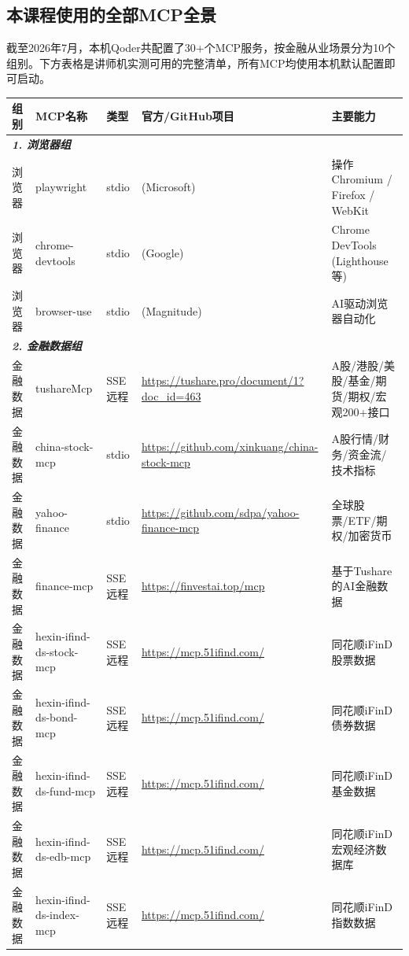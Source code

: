 \subsection{本课程使用的全部MCP全景}

截至2026年7月，本机Qoder共配置了30+个MCP服务，按金融从业场景分为10个组别。下方表格是讲师机实测可用的完整清单，所有MCP均使用本机默认配置即可启动。

\begin{table}[H]
\centering
\small
\begin{tabular}{llllp{4cm}}
\toprule
\textbf{组别} & \textbf{MCP名称} & \textbf{类型} & \textbf{官方/GitHub项目} & \textbf{主要能力} \\
\midrule
\multicolumn{5}{l}{\textit{\textbf{1. 浏览器组}}} \\
\midrule
浏览器 & playwright & stdio & (Microsoft) & 操作Chromium / Firefox / WebKit \\
浏览器 & chrome-devtools & stdio & (Google) & Chrome DevTools (Lighthouse等) \\
浏览器 & browser-use & stdio & (Magnitude) & AI驱动浏览器自动化 \\
\midrule
\multicolumn{5}{l}{\textit{\textbf{2. 金融数据组}}} \\
\midrule
金融数据 & tushareMcp & SSE远程 & \url{https://tushare.pro/document/1?doc_id=463} & A股/港股/美股/基金/期货/期权/宏观200+接口 \\
金融数据 & china-stock-mcp & stdio & \url{https://github.com/xinkuang/china-stock-mcp} & A股行情/财务/资金流/技术指标 \\
金融数据 & yahoo-finance & stdio & \url{https://github.com/sdpa/yahoo-finance-mcp} & 全球股票/ETF/期权/加密货币 \\
金融数据 & finance-mcp & SSE远程 & \url{https://finvestai.top/mcp} & 基于Tushare的AI金融数据 \\
金融数据 & hexin-ifind-ds-stock-mcp & SSE远程 & \url{https://mcp.51ifind.com/} & 同花顺iFinD股票数据 \\
金融数据 & hexin-ifind-ds-bond-mcp & SSE远程 & \url{https://mcp.51ifind.com/} & 同花顺iFinD债券数据 \\
金融数据 & hexin-ifind-ds-fund-mcp & SSE远程 & \url{https://mcp.51ifind.com/} & 同花顺iFinD基金数据 \\
金融数据 & hexin-ifind-ds-edb-mcp & SSE远程 & \url{https://mcp.51ifind.com/} & 同花顺iFinD宏观经济数据库 \\
金融数据 & hexin-ifind-ds-index-mcp & SSE远程 & \url{https://mcp.51ifind.com/} & 同花顺iFinD指数数据 \\

\end{tabular}
\end{table}
